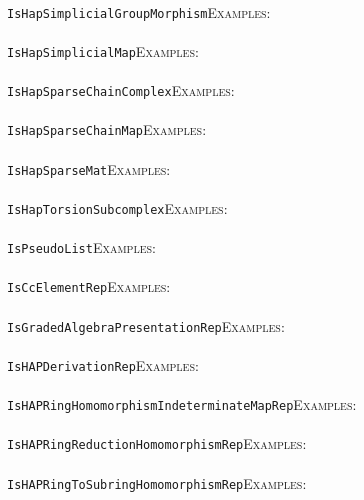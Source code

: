 \documentclass[a4paper,11pt]{report}
\begin{document}
{{ \\
 \texttt{IsHapSimplicialGroupMorphism}{\nobreakspace}{\nobreakspace}{\nobreakspace}{\nobreakspace}\textsc{Examples:} \\
 \\
 \texttt{IsHapSimplicialMap}{\nobreakspace}{\nobreakspace}{\nobreakspace}{\nobreakspace}\textsc{Examples:} \\
 \\
 \texttt{IsHapSparseChainComplex}{\nobreakspace}{\nobreakspace}{\nobreakspace}{\nobreakspace}\textsc{Examples:} \\
 \\
 \texttt{IsHapSparseChainMap}{\nobreakspace}{\nobreakspace}{\nobreakspace}{\nobreakspace}\textsc{Examples:} \\
 \\
 \texttt{IsHapSparseMat}{\nobreakspace}{\nobreakspace}{\nobreakspace}{\nobreakspace}\textsc{Examples:} \\
 \\
 \texttt{IsHapTorsionSubcomplex}{\nobreakspace}{\nobreakspace}{\nobreakspace}{\nobreakspace}\textsc{Examples:} \\
 \\
 \texttt{IsPseudoList}{\nobreakspace}{\nobreakspace}{\nobreakspace}{\nobreakspace}\textsc{Examples:} \\
 \\
 \texttt{IsCcElementRep}{\nobreakspace}{\nobreakspace}{\nobreakspace}{\nobreakspace}\textsc{Examples:} \\
 \\
 \texttt{IsGradedAlgebraPresentationRep}{\nobreakspace}{\nobreakspace}{\nobreakspace}{\nobreakspace}\textsc{Examples:} \\
 \\
 \texttt{IsHAPDerivationRep}{\nobreakspace}{\nobreakspace}{\nobreakspace}{\nobreakspace}\textsc{Examples:} \\
 \\
 \texttt{IsHAPRingHomomorphismIndeterminateMapRep}{\nobreakspace}{\nobreakspace}{\nobreakspace}{\nobreakspace}\textsc{Examples:} \\
 \\
 \texttt{IsHAPRingReductionHomomorphismRep}{\nobreakspace}{\nobreakspace}{\nobreakspace}{\nobreakspace}\textsc{Examples:} \\
 \\
 \texttt{IsHAPRingToSubringHomomorphismRep}{\nobreakspace}{\nobreakspace}{\nobreakspace}{\nobreakspace}\textsc{Examples:} \\
 \\
}}
\end{document}
